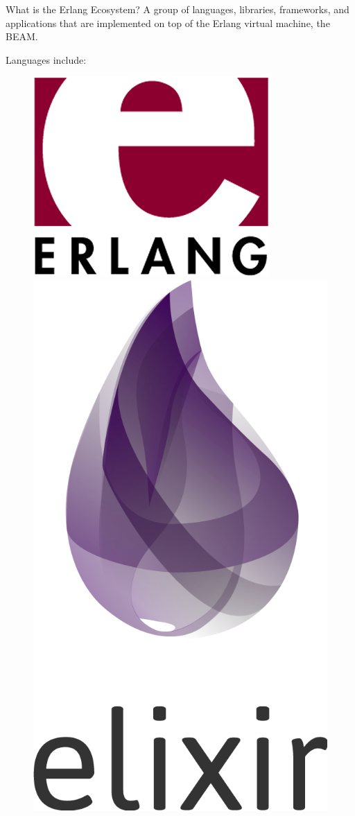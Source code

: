 \documentclass[
  ignorenonframetext,
  aspectratio=169]{beamer}
\begin{document}
\begin{frame}{What is the Erlang Ecosystem?}
\label{what-is-the-erlang-ecosystem}
A group of languages, libraries, frameworks, and applications that are
implemented on top of the Erlang virtual machine, the BEAM.

Languages include:

\begin{figure}
\centering
\begin{minipage}{.24\textwidth}
  \centering
  \includegraphics[width=.8\linewidth]{./img/erlang_logo.png}
\end{minipage}
\begin{minipage}{.24\textwidth}
  \centering
  \includegraphics[width=.8\linewidth]{./img/elixir-vertical.png}

\end{minipage}
\end{figure}
\end{frame}
\end{document}
